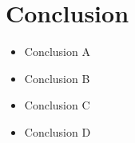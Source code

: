 \section{Conclusion}
\begin{frame}
    \begin{itemize}
        \item Conclusion A
        \item Conclusion B
        \item Conclusion C
        \item Conclusion D
    \end{itemize}
\end{frame}